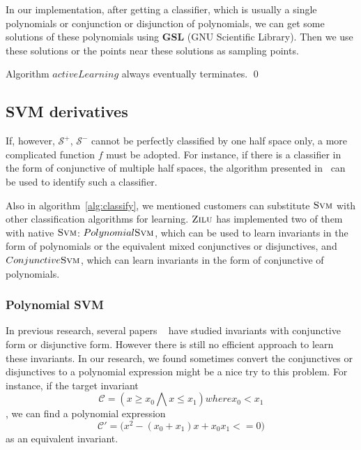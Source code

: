 In our implementation, after getting a classifier, which is usually a single polynomials or conjunction or disjunction of polynomials,
we can get some solutions of these polynomials using \textbf{GSL} (GNU Scientific Library).
Then we use these solutions or the points near these solutions as sampling points.

\begin{example}
\end{example}

\begin{proposition}
Algorithm $activeLearning$ always eventually terminates. \hfill \qed
\end{proposition}


\subsection{SVM derivatives}
If, however, $\mathcal{S}^+$, $\mathcal{S}^-$ cannot be perfectly classified by one half space only, 
a more complicated function $f$ must be adopted. 
For instance, if there is a classifier in the form of conjunctive of multiple half spaces, 
the algorithm presented in~\cite{Sharma2012} can be used to identify such a classifier.

Also in algorithm~\ref{alg:classify}, we mentioned customers can substitute $\textsc{Svm}$ with other classification algorithms for learning.
$\textsc{Zilu}$ has implemented two of them with native $\textsc{Svm}$: 
$Polynomial \textsc{Svm}$, which can be used to learn invariants in the form of polynomials or the equivalent mixed conjunctives or disjunctives,
and $Conjunctive \textsc{Svm}$, which can learn invariants in the form of conjunctive of polynomials.

\subsubsection{Polynomial SVM}
In previous research, several papers ~\cite{**} have studied invariants with conjunctive form or disjunctive form.
However there is still no efficient approach to learn these invariants.
In our research, we found sometimes convert the conjunctives or disjunctives to a polynomial expression might be a nice try to this problem.
For instance, if the target invariant 
$$\mathcal{C} = (x \ge x_0 \bigwedge x \le x_1) where x_0 < x_1$$,
we can find a polynomial expression 
$$\mathcal{C}' = \big(x^2 - (x_0 + x_1)x + x_0x_1 <= 0\big)$$ 
as an equivalent invariant.

